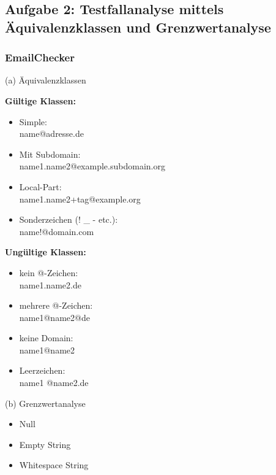 \subsection*{Aufgabe 2: Testfallanalyse mittels Äquivalenzklassen und Grenzwertanalyse}

\subsubsection*{EmailChecker}
(a) Äquivalenzklassen\\
\begin{minipage}[t]{0.48\textwidth}
\textbf{Gültige Klassen:}
\begin{itemize}
    \item Simple: \\ name@adresse.de
    \item Mit Subdomain: \\ name1.name2@example.subdomain.org
    \item Local-Part: \\ name1.name2+tag@example.org
    \item Sonderzeichen (! \_ - etc.): \\ name!@domain.com
\end{itemize}
\end{minipage}
\hfill
\begin{minipage}[t]{0.48\textwidth}
\textbf{Ungültige Klassen:}
\begin{itemize}
    \item kein @-Zeichen: \\ name1.name2.de
    \item mehrere @-Zeichen: \\ name1@name2@de
    \item keine Domain: \\ name1@name2
    \item Leerzeichen: \\ name1 @name2.de
\end{itemize}
\end{minipage}

\vspace{1em}

(b) Grenzwertanalyse
\begin{itemize}
    \item Null
    \item Empty String
    \item Whitespace String
\end{itemize}

